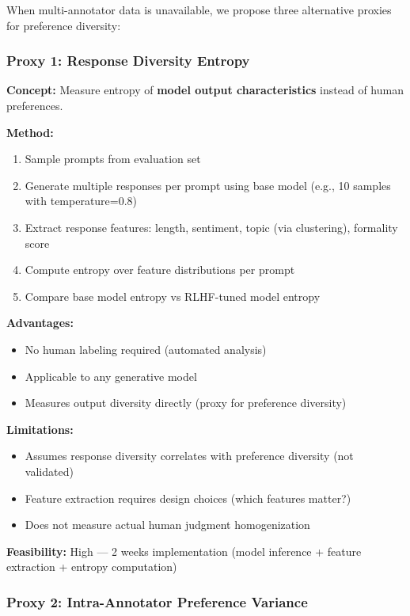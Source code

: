 When multi-annotator data is unavailable, we propose three alternative proxies for preference diversity:

\subsubsection{Proxy 1: Response Diversity Entropy}

\textbf{Concept:} Measure entropy of \textbf{model output characteristics} instead of human preferences.

\textbf{Method:}
\begin{enumerate}
\item Sample prompts from evaluation set
\item Generate multiple responses per prompt using base model (e.g., 10 samples with temperature=0.8)
\item Extract response features: length, sentiment, topic (via clustering), formality score
\item Compute entropy over feature distributions per prompt
\item Compare base model entropy vs RLHF-tuned model entropy
\end{enumerate}

\textbf{Advantages:}
\begin{itemize}
\item No human labeling required (automated analysis)
\item Applicable to any generative model
\item Measures output diversity directly (proxy for preference diversity)
\end{itemize}

\textbf{Limitations:}
\begin{itemize}
\item Assumes response diversity correlates with preference diversity (not validated)
\item Feature extraction requires design choices (which features matter?)
\item Does not measure actual human judgment homogenization
\end{itemize}

\textbf{Feasibility:} High — 2 weeks implementation (model inference + feature extraction + entropy computation)

\subsubsection{Proxy 2: Intra-Annotator Preference Variance}

